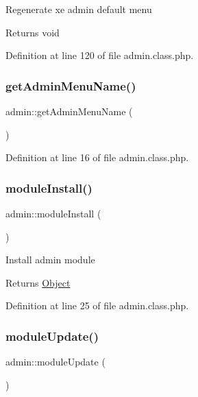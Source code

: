 Regenerate xe admin default menu \begin{DoxyReturn}{Returns}
void 
\end{DoxyReturn}


Definition at line 120 of file admin.\+class.\+php.

\mbox{\label{classadmin_ad380bb9d26a45cb880a7bfd94ea5aa03}} 
\subsubsection{\texorpdfstring{get\+Admin\+Menu\+Name()}{getAdminMenuName()}}
{\footnotesize\ttfamily admin\+::get\+Admin\+Menu\+Name (\begin{DoxyParamCaption}{ }\end{DoxyParamCaption})}



Definition at line 16 of file admin.\+class.\+php.

\mbox{\label{classadmin_abd41ac19cf93c34fb1524aafac45c76e}} 
\subsubsection{\texorpdfstring{module\+Install()}{moduleInstall()}}
{\footnotesize\ttfamily admin\+::module\+Install (\begin{DoxyParamCaption}{ }\end{DoxyParamCaption})}

Install admin module \begin{DoxyReturn}{Returns}
\hyperlink{classObject}{Object} 
\end{DoxyReturn}


Definition at line 25 of file admin.\+class.\+php.

\mbox{\label{classadmin_a57ea73a68677930fd02b4ad0f29a9549}} 
\subsubsection{\texorpdfstring{module\+Update()}{moduleUpdate()}}
{\footnotesize\ttfamily admin\+::module\+Update (\begin{DoxyParamCaption}{ }\end{DoxyParamCaption})}

